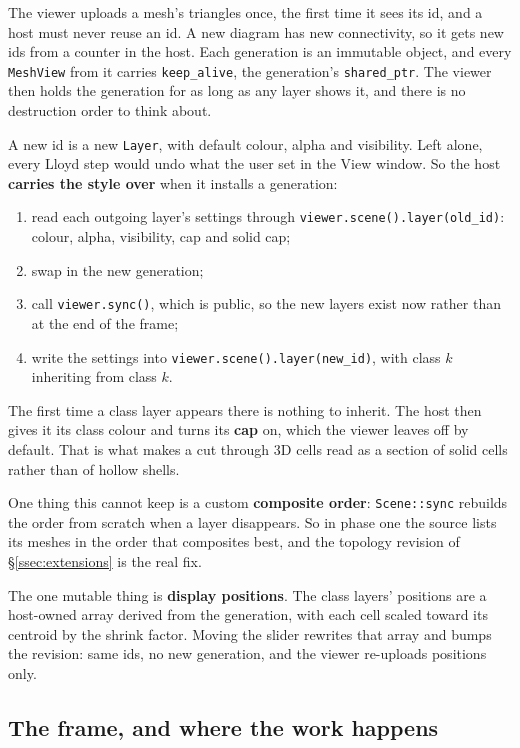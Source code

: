 \documentclass[11pt,a4paper]{article}
\newcommand{\code}[1]{\texttt{#1}}          %
\newcommand{\secref}[1]{\S\ref{#1}}
\begin{document}
The viewer uploads a mesh's triangles once, the first time it sees its id, and a host must never
reuse an id. A new diagram has new connectivity, so it gets new ids from a counter in the host.
Each generation is an immutable object, and every \code{MeshView} from it carries
\code{keep\_alive}, the generation's \code{shared\_ptr}. The viewer then holds the generation for
as long as any layer shows it, and there is no destruction order to think about.

A new id is a new \code{Layer}, with default colour, alpha and visibility. Left alone, every
Lloyd step would undo what the user set in the View window. So the host \textbf{carries the style
over} when it installs a generation:

\begin{enumerate}
\item read each outgoing layer's settings through \code{viewer.scene().layer(old\_id)}: colour,
  alpha, visibility, cap and solid cap;
\item swap in the new generation;
\item call \code{viewer.sync()}, which is public, so the new layers exist now rather than at the
  end of the frame;
\item write the settings into \code{viewer.scene().layer(new\_id)}, with class $k$ inheriting from
  class $k$.
\end{enumerate}

The first time a class layer appears there is nothing to inherit. The host then gives it its
class colour and turns its \textbf{cap} on, which the viewer leaves off by default. That is what
makes a cut through 3D cells read as a section of solid cells rather than of hollow shells.

One thing this cannot keep is a custom \textbf{composite order}: \code{Scene::sync} rebuilds the
order from scratch when a layer disappears. So in phase one the source lists its meshes in the
order that composites best, and the topology revision of \secref{ssec:extensions} is the real
fix.

The one mutable thing is \textbf{display positions}. The class layers' positions are a host-owned
array derived from the generation, with each cell scaled toward its centroid by the shrink
factor. Moving the slider rewrites that array and bumps the revision: same ids, no new
generation, and the viewer re-uploads positions only.

\subsection{The frame, and where the work happens}\label{ssec:frame}
\end{document}
